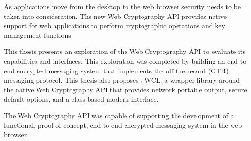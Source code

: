 As applications move from the desktop to the web browser security needs to be taken into consideration. The new Web Cryptography API provides native support for web applications to perform cryptographic operations and key management functions. 


This thesis presents an exploration of the Web Cryptography API to evaluate its capabilities and interfaces. This exploration was completed by building an end to end encrypted messaging system that implements the off the record (OTR) messaging protocol. This thesis also proposes JWCL, a wrapper library around the native Web Cryptography API that provides network portable output, secure default options, and a class based modern interface. 


The Web Cryptography API was capable of supporting the development of a functional, proof of concept, end to end encrypted messaging system in the web browser.    

